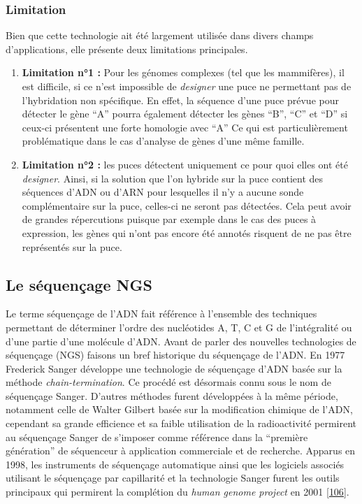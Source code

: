 \documentclass[12pt,a4paper,twoside]{ugathesis}
\theoremstyle{definition}
\theoremstyle{definition}
\theoremstyle{definition}
\theoremstyle{remark}
\begin{document}
\subsubsection{Limitation}\label{limitation}

Bien que cette technologie ait été largement utilisée dans divers champs
d'applications, elle présente deux limitations principales.

\begin{enumerate}
\def\labelenumi{\arabic{enumi}.}
\item
  \textbf{Limitation n°1 :} Pour les génomes complexes (tel que les
  mammifères), il est difficile, si ce n'est impossible de
  \emph{designer} une puce ne permettant pas de l'hybridation non
  spécifique. En effet, la séquence d'une puce prévue pour détecter le
  gène ``A'' pourra également détecter les gènes ``B'', ``C'' et ``D''
  si ceux-ci présentent une forte homologie avec ``A'' Ce qui est
  particulièrement problématique dans le cas d'analyse de gènes d'une
  même famille.
\item
  \textbf{Limitation n°2 :} les puces détectent uniquement ce pour quoi
  elles ont été \emph{designer}. Ainsi, si la solution que l'on hybride
  sur la puce contient des séquences d'ADN ou d'ARN pour lesquelles il
  n'y a aucune sonde complémentaire sur la puce, celles-ci ne seront pas
  détectées. Cela peut avoir de grandes répercutions puisque par exemple
  dans le cas des puces à expression, les gènes qui n'ont pas encore été
  annotés risquent de ne pas être représentés sur la puce.
\end{enumerate}

\newpage

\hypertarget{ngs}{\subsection{Le séquençage NGS}\label{ngs}}

Le terme séquençage de l'ADN fait référence à l'ensemble des techniques
permettant de déterminer l'ordre des nucléotides A, T, C et G de
l'intégralité ou d'une partie d'une molécule d'ADN. Avant de parler des
nouvelles technologies de séquençage (NGS) faisons un bref historique du
séquençage de l'ADN. En 1977 Frederick Sanger développe une technologie
de séquençage d'ADN basée sur la méthode \emph{chain-termination}. Ce
procédé est désormais connu sous le nom de séquençage Sanger. D'autres
méthodes furent développées à la même période, notamment celle de Walter
Gilbert basée sur la modification chimique de l'ADN, cependant sa grande
efficience et sa faible utilisation de la radioactivité permirent au
séquençage Sanger de s'imposer comme référence dans la ``première
génération'' de séquenceur à application commerciale et de recherche.
Apparus en 1998, les instruments de séquençage automatique ainsi que les
logiciels associés utilisant le séquençage par capillarité et la
technologie Sanger furent les outils principaux qui permirent la
complétion du \emph{human genome project} en 2001
{[}\protect\hyperlink{ref-Collins2003}{106}{]}.
\end{document}
